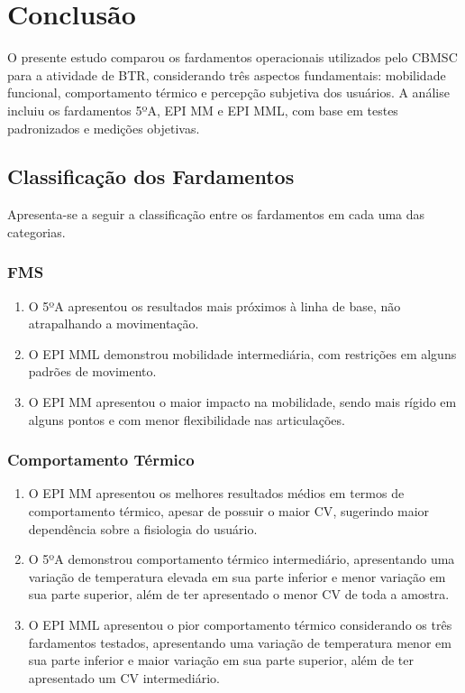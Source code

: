 \chapter{Conclusão}
    O presente estudo comparou os fardamentos operacionais utilizados pelo \acrshort{CBMSC} para a 
    atividade de \acrlong{BTR}, considerando três aspectos fundamentais: mobilidade funcional, 
    comportamento térmico e percepção subjetiva dos usuários. A análise incluiu os fardamentos 5ºA, 
    EPI \acrlong{MM} e EPI \acrlong{MML}, com base em testes padronizados e medições objetivas.
    
    \section{Classificação dos Fardamentos}
        Apresenta-se a seguir a classificação entre os fardamentos em cada uma das categorias.
        \subsection{\acrlong{FMS}}
            \begin{enumerate}[label=\Roman*.] %
                \item O 5ºA apresentou os resultados mais próximos à linha de base, não atrapalhando a 
                movimentação.
                \item O \acrshort{EPI} \acrlong{MML} demonstrou mobilidade intermediária, com 
                restrições em alguns padrões de movimento.
                \item O \acrshort{EPI} \acrlong{MM} apresentou o maior impacto na mobilidade, sendo 
                mais rígido em alguns pontos e com menor flexibilidade nas articulações.
                \end{enumerate}

        \subsection{Comportamento Térmico}
            \begin{enumerate}[label=\Roman*.] %
                \item O \acrshort{EPI} \acrlong{MM} apresentou os melhores resultados médios em termos de 
                comportamento térmico, apesar de possuir o maior \acrlong{CV}, sugerindo maior dependência 
                sobre a fisiologia do usuário.
                \item O 5ºA demonstrou comportamento térmico intermediário, apresentando uma variação de 
                temperatura elevada em sua parte inferior e menor variação em sua parte superior, além de 
                ter apresentado o menor \acrlong{CV} de toda a amostra.
                \item O \acrshort{EPI} \acrlong{MML} apresentou o pior comportamento térmico considerando os 
                três fardamentos testados, apresentando uma variação de temperatura menor em 
                sua parte inferior e maior variação em sua parte superior, além de 
                ter apresentado um \acrlong{CV} intermediário.
                \end{enumerate}    


